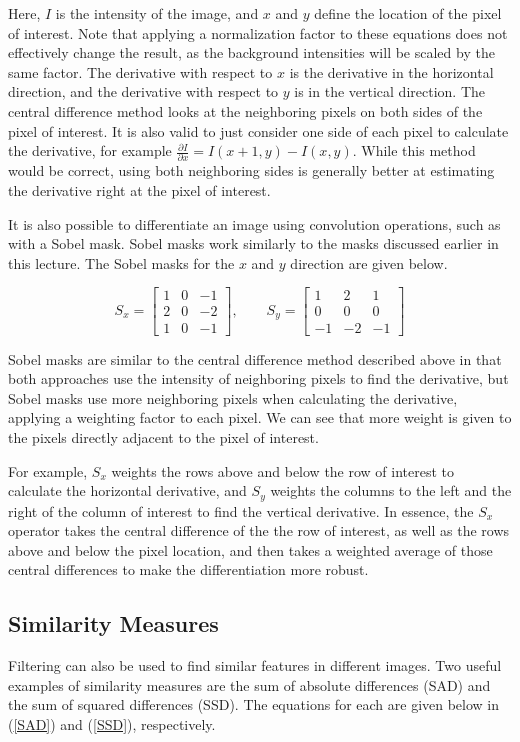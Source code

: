 \documentclass[twoside]{article}
\begin{document}
Here, $I$ is the intensity of the image, and $x$ and $y$ define the location of the pixel of interest. Note that applying a normalization factor to these equations does not effectively change the result, as the background intensities will be scaled by the same factor. The derivative with respect to $x$ is the derivative in the horizontal direction, and the derivative with respect to $y$ is in the vertical direction. The central difference method looks at the neighboring pixels on both sides of the pixel of interest. It is also valid to just consider one side of each pixel to calculate the derivative, for example $\frac{\partial I}{\partial x} = I(x+1,y) - I(x,y)$. While this method would be correct, using both neighboring sides is generally better at estimating the derivative right at the pixel of interest.

It is also possible to differentiate an image using convolution operations, such as with a Sobel mask.  Sobel masks work similarly to the masks discussed earlier in this lecture. The Sobel masks for the $x$ and $y$ direction are given below.

\[
S_x =
\begin{bmatrix}
1 & 0 & -1\\
2 & 0 & -2\\
1 & 0 & -1
\end{bmatrix}
, \qquad S_y =
\begin{bmatrix}
1 & 2 & 1\\
0 & 0 & 0\\
-1 & -2 & -1
\end{bmatrix}
\]

Sobel masks are similar to the central difference method described above in that both approaches use the intensity of neighboring pixels to find the derivative, but Sobel masks use more neighboring pixels when calculating the derivative, applying a weighting factor to each pixel. We can see that more weight is given to the pixels directly adjacent to the pixel of interest.

For example, $S_x$ weights the rows above and below the row of interest to calculate the horizontal derivative, and $S_y$ weights the columns to the left and the right of the column of interest to find the vertical derivative. In essence, the $S_x$ operator takes the central difference of the the row of interest, as well as the rows above and below the pixel location, and then takes a weighted average of those central differences to make the differentiation more robust.


\subsection{Similarity Measures}
Filtering can also be used to find similar features in different images. Two useful examples of similarity measures are the sum of absolute differences (SAD) and the sum of squared differences (SSD). The equations for each are given below in (\ref{SAD}) and (\ref{SSD}), respectively.
\end{document}
